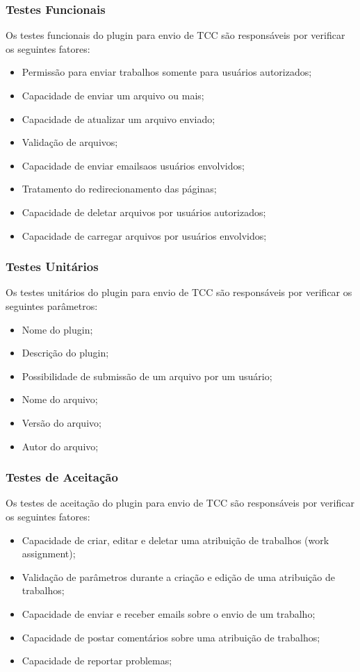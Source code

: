 \subsubsection{Testes Funcionais}

Os testes funcionais do plugin para envio de TCC são responsáveis por verificar os seguintes fatores:

\begin{itemize}
\item Permissão para enviar trabalhos somente para usuários autorizados;
\item Capacidade de enviar um arquivo ou mais;
\item Capacidade de atualizar um arquivo enviado;
\item Validação de arquivos;
\item Capacidade de enviar emailsaos usuários envolvidos;
\item Tratamento do redirecionamento das páginas;
\item Capacidade de deletar arquivos por usuários autorizados;
\item Capacidade de carregar arquivos por usuários envolvidos;
\end{itemize}

\subsubsection{Testes Unitários}

Os testes unitários do plugin para envio de TCC são responsáveis por verificar os seguintes parâmetros:

\begin{itemize}
\item Nome do plugin;
\item Descrição do plugin;
\item Possibilidade de submissão de um arquivo por um usuário;
\item Nome do arquivo;
\item Versão do arquivo;
\item Autor do arquivo;
\end{itemize}

\subsubsection{Testes de Aceitação}

Os testes de aceitação do plugin para envio de TCC são responsáveis por verificar os seguintes fatores:

\begin{itemize}
\item Capacidade de criar, editar e deletar uma atribuição de trabalhos (work assignment);
\item Validação de parâmetros durante a criação e edição de uma atribuição de trabalhos;
\item Capacidade de enviar e receber emails sobre o envio de um trabalho;
\item Capacidade de postar comentários sobre uma atribuição de trabalhos;
\item Capacidade de reportar problemas;
\end{itemize}